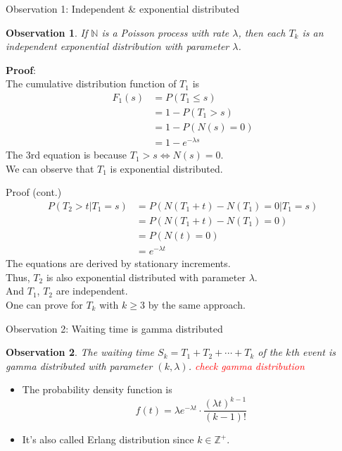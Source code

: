 \documentclass[mathserif]{beamer}
\newtheorem{obs}{Observation}
\begin{document}
\begin{frame}{Observation 1: Independent \& exponential distributed}
\begin{obs}
If $\mathbb{N}$ is a Poisson process with rate $\lambda$,
then each $T_k$ is an independent exponential distribution with parameter $\lambda$.
\end{obs}
\textbf{Proof}:\\
The cumulative distribution function of $T_1$ is
\begin{align*}
F_1(s) & = P(T_1 \leq s) \\
& = 1 - P(T_1 > s) \\
& = 1 - P(N(s) = 0) \\
& = 1 - e^{-\lambda s}
\end{align*}
The 3rd equation is because $T_1 > s \iff N(s) = 0$. \\
We can observe that $T_1$ is exponential distributed.
\end{frame}

\begin{frame}{Proof (cont.)}
\begin{align*}
P(T_2 > t | T_1 = s) & = P(N(T_1+t) - N(T_1) = 0 | T_1 = s) \\
& = P(N(T_1+t) - N(T_1) = 0) \\
& = P(N(t) = 0) \\
& = e^{-\lambda t}
\end{align*}
The equations are derived by stationary increments.\\
\vspace{\baselineskip}
Thus, $T_2$ is also exponential distributed with parameter $\lambda$. \\
And $T_1$, $T_2$ are independent. \\
One can prove for $T_k$ with $k \geq 3$ by the same approach.
\end{frame}

\begin{frame}{Observation 2: Waiting time is gamma distributed}
\begin{obs}
The waiting time $S_k = T_1 + T_2 + \cdots + T_k$ of the $k$th event is gamma distributed with parameter $(k, \lambda)$. \textcolor{red}{check gamma distribution}
\end{obs}
\begin{itemize}
\item The probability density function is
\[
f(t) = \lambda e^{-\lambda t}\cdot \frac{(\lambda t)^{k-1}}{(k-1)!}
\]
\item It's also called Erlang distribution since $k \in \mathbb{Z}^+$.
\end{itemize}
\end{frame}
\end{document}
